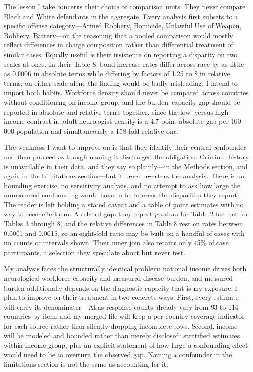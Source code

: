 \documentclass[11pt]{article}
\begin{document}
The lesson I take concerns their choice of comparison units. They never compare
Black and White defendants in the aggregate. Every analysis first subsets to a
specific offense category---Armed Robbery, Homicide, Unlawful Use of Weapon,
Robbery, Battery---on the reasoning that a pooled comparison would mostly reflect
differences in charge composition rather than differential treatment of similar
cases. Equally useful is their insistence on reporting a disparity on two scales
at once. In their Table 8, bond-increase rates differ across race by as little as
0.0006 in absolute terms while differing by factors of 1.25 to 8 in relative
terms; on either scale alone the finding would be badly misleading. I intend to
import both habits. Workforce density should never be compared across countries
without conditioning on income group, and the burden--capacity gap should be
reported in absolute and relative terms together, since the low- versus
high-income contrast in adult neurologist density is a 4.7-point absolute gap per
100\,000 population and simultaneously a 158-fold relative one.

The weakness I want to improve on is that they identify their central confounder
and then proceed as though naming it discharged the obligation. Criminal history
is unavailable in their data, and they say so plainly---in the Methods section,
and again in the Limitations section---but it never re-enters the analysis. There
is no bounding exercise, no sensitivity analysis, and no attempt to ask how large
the unmeasured confounding would have to be to erase the disparities they report.
The reader is left holding a stated caveat and a table of point estimates with no
way to reconcile them. A related gap: they report $p$-values for Table 2 but not
for Tables 3 through 8, and the relative differences in Table 8 rest on rates
between 0.0001 and 0.0015, so an eight-fold ratio may be built on a handful of
cases with no counts or intervals shown. Their inner join also retains only 45\%
of case participants, a selection they speculate about but never test.

My analysis faces the structurally identical problem: national income drives both
neurological workforce capacity and measured disease burden, and measured burden
additionally depends on the diagnostic capacity that is my exposure. I plan to
improve on their treatment in two concrete ways. First, every estimate will carry
its denominator---Atlas response counts already vary from 93 to 114 countries by
item, and my merged file will keep a per-country coverage indicator for each
source rather than silently dropping incomplete rows. Second, income will be
modeled and bounded rather than merely disclosed: stratified estimates within
income group, plus an explicit statement of how large a confounding effect would
need to be to overturn the observed gap. Naming a confounder in the limitations
section is not the same as accounting for it.
\end{document}
